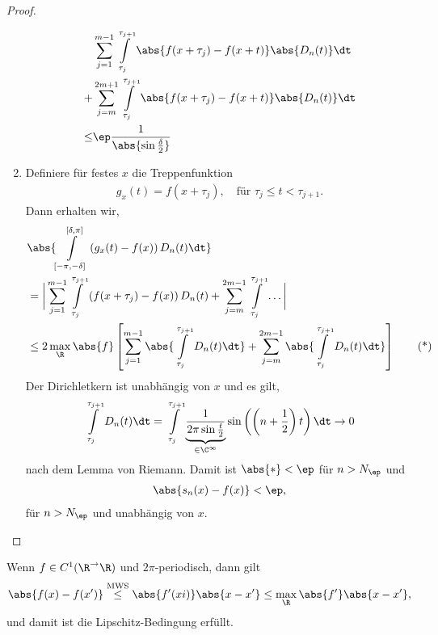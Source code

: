 \begin{proof}
\begin{enumerate}[label=\arabic{*}.)]
\begin{align*}
&\sum\limits_{j=1}^{m-1} \int\limits_{\tau_j}^{\tau_{j+1}}
\abs{f(x+\tau_j)-f(x+t)}\abs{D_n(t)}\dt\\
 +& \sum\limits_{j=m}^{2m+1}
\int\limits_{\tau_j}^{\tau_{j+1}} \abs{f(x+\tau_j)-f(x+t)}\abs{D_n(t)}\dt\\
 \le&\ep \frac{1}{\abs{\sin\frac{\delta}{2}}}
\end{align*}
\item Definiere für festes $x$ die Treppenfunktion
\begin{align*}
g_x(t) = f(x+\tau_j),\quad\text{für } \tau_j \le t < \tau_{j+1}.
\end{align*}
Dann erhalten wir,
\begin{align*}
&\abs{\int\limits_{[-\pi,-\delta]}^{[\delta,\pi]} \left(g_x(t) - f(x)\right)
D_n(t)\dt}\\
&= \bigg|\sum\limits_{j=1}^{m-1}\int\limits_{\tau_j}^{\tau_{j+1}}
\left(f(x+\tau_j)-f(x)\right)D_n(t) + 
\sum\limits_{j=m}^{2m-1}\int\limits_{\tau_j}^{\tau_{j+1}}
\ldots
\bigg|\\
&\le 2\max\limits_{\R} \abs{f}
\left[
\sum\limits_{j=1}^{m-1} \abs{\int\limits_{\tau_j}^{\tau_{j+1}} D_n(t)\dt}
+
\sum\limits_{j=m}^{2m-1}\abs{\int\limits_{\tau_j}^{\tau_{j+1}} D_n(t)\dt}
\right]\tag{*}
\end{align*}
Der Dirichletkern ist unabhängig von $x$ und es gilt,
\begin{align*}
\int\limits_{\tau_j}^{\tau_{j+1}} D_n(t)\dt =
\int\limits_{\tau_j}^{\tau_{j+1}}
\underbrace{\frac{1}{2\pi\sin\frac{t}{2}}}_{\in\C^\infty}
\sin\left(\left(n+\frac{1}{2}\right)t\right) \dt \to 0
\end{align*}
nach dem Lemma von Riemann. Damit ist $\abs{*} < \ep$ für $n > N_\ep$ und
\begin{align*}
\abs{s_n(x)-f(x)} <\ep,
\end{align*}
für $n > N_\ep$ und unabhängig von $x$.\qedhere
\end{enumerate}
\end{proof}

\begin{bem}
\label{bem:1.57}
Wenn $f\in C^1(\R^\to\R)$ und $2\pi$-periodisch, dann gilt
\begin{align*}
\abs{f(x)-f(x')} \overset{\text{MWS}}{\le} \abs{f'(xi)}\abs{x-x'} \le
\max\limits_\R \abs{f'}\abs{x-x'},
\end{align*}
und damit ist die Lipschitz-Bedingung erfüllt.\maphere
\end{bem}

